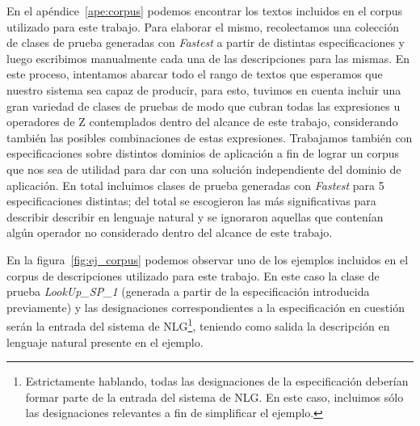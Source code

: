 En el apéndice~\ref{ape:corpus} podemos encontrar los textos incluidos en el corpus utilizado para este trabajo. Para elaborar el mismo, recolectamos una colección de clases de prueba generadas con \emph{Fastest} a partir de distintas especificaciones y luego escribimos manualmente cada una de las descripciones para las mismas. En este proceso, intentamos abarcar todo el rango de textos que esperamos que nuestro sistema sea capaz de producir, para esto, tuvimos en cuenta incluir una gran variedad de clases de pruebas de modo que cubran todas las expresiones u operadores de Z contemplados dentro del alcance de este trabajo, considerando también las posibles combinaciones de estas expresiones. Trabajamos también con especificaciones sobre distintos dominios de aplicación a fin de lograr un corpus que nos sea de utilidad para dar con una solución independiente del dominio de aplicación. En total incluimos clases de prueba generadas con \emph{Fastest} para 5 especificaciones distintas; del total se escogieron las más significativas para describir describir en lenguaje natural y se ignoraron aquellas que contenían algún operador no considerado dentro del alcance de este trabajo.


En la figura~\ref{fig:ej_corpus} podemos observar uno de los ejemplos incluidos en el corpus de descripciones utilizado para este trabajo. En este caso la clase de prueba \emph{LookUp\_SP\_1} (generada a partir de la especificación introducida previamente) y las designaciones correspondientes a la especificación en cuestión serán la entrada del sistema de NLG\footnote{Estrictamente hablando, todas las designaciones de la especificación deberían formar parte de la entrada del sistema de NLG. En este caso, incluimos sólo las designaciones relevantes a fin de simplificar el ejemplo.}, teniendo como salida la descripción en lenguaje natural presente en el ejemplo.

